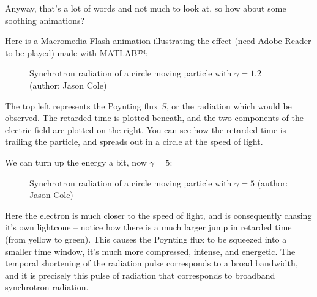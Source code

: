 	
	
	
	
	
	
	
	
	
	
	
	
	
	
	
	
	
	
	
	
	
	
	
	
	
	
	
	
	
	
	
	
	
	
	Anyway, that's a lot of words and not much to look at, so how about some soothing animations? 
	
	Here is a Macromedia Flash animation illustrating the effect (need Adobe Reader to be played) made with MATLAB™:
	\begin{figure}[H]
		\caption[Synchrotron radiation of a circle moving particle with $\gamma=1.2$]{Synchrotron radiation of a circle moving particle with $\gamma=1.2$ (author: Jason Cole)}
	\end{figure}
	The top left represents the Poynting flux $S$, or the radiation which would be observed. The retarded time is plotted beneath, and the two components of the electric field are plotted on the right. You can see how the retarded time is trailing the particle, and spreads out in a circle at the speed of light.

	We can turn up the energy a bit, now $\gamma = 5$:
	\begin{figure}[H]
		\caption[Synchrotron radiation of a circle moving particle with $\gamma=5$]{Synchrotron radiation of a circle moving particle with $\gamma=5$ (author: Jason Cole)}
	\end{figure}
	Here the electron is much closer to the speed of light, and is consequently chasing it's own lightcone – notice how there is a much larger jump in retarded time (from yellow to green). This causes the Poynting flux to be squeezed into a smaller time window, it's much more compressed, intense, and energetic. The temporal shortening of the radiation pulse corresponds to a broad bandwidth, and it is precisely this pulse of radiation that corresponds to broadband synchrotron radiation.
	
